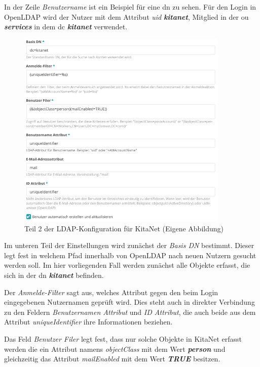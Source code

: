 In der Zeile \textit{Benutzername} ist ein Beispiel für eine \ac{dn} zu sehen. Für den Login in OpenLDAP wird der Nutzer mit dem Attribut \textit{uid} \textbf{\textit{kitanet}}, Mitglied in der \ac{ou} \textbf{\textit{services}} in dem \ac{dc} \textbf{\textit{kitanet}} verwendet.

\begin{figure}[H]
  \centering
  \includegraphics[width=0.9\textwidth]{res/ldapkitanet2.png}
  \caption{Teil 2 der LDAP-Konfiguration für KitaNet (Eigene Abbildung)}
  \label{fig:LDAP KitaNet Teil 2}
\end{figure}

Im unteren Teil der Einstellungen wird zunächst der \textit{Basis DN} bestimmt. Dieser legt fest in welchem Pfad innerhalb von OpenLDAP nach neuen Nutzern gesucht werden soll. Im hier vorliegenden Fall werden zunächst alle Objekte erfasst, die sich in der \ac{dn} \textbf{\textit{kitanet}} befinden.

Der \textit{Anmelde-Filter} sagt aus, welches Attribut gegen den beim Login eingegebenen Nutzernamen geprüft wird. 
Dies steht auch in direkter Verbindung zu den Feldern \textit{Benutzernamen Attribut} und \textit{ID Attribut}, die auch beide aus dem Attribut \textit{uniqueIdentifier} ihre Informationen beziehen. 

Das Feld \textit{Benutzer Filer} legt fest, dass nur solche Objekte in KitaNet erfasst werden die ein Attribut namens \textit{objectClass} mit dem Wert \textbf{\textit{person}} und gleichzeitig das Attribut \textit{mailEnabled} mit dem Wert \textbf{\textit{TRUE}} besitzen.

